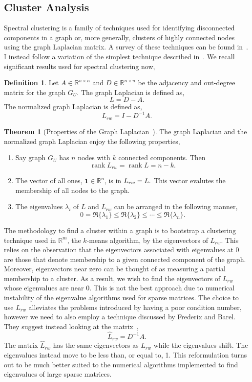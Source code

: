 \documentclass[letterpaper, 10 pt, conference]{ieeeconf}
\theoremstyle{definition}
\newtheorem{definition}{Definition}[section]
\newtheorem{theorem}{Theorem}[section]
\let\ker\relax
\DeclareMathOperator{\rank}{rank}
\DeclareMathOperator{\ker}{ker}
\newcommand{\R}{\mathbb{R}}
\begin{document}
\subsection{Cluster Analysis}
Spectral clustering is a family of techniques used for identifying disconnected components in a graph or, more generally, clusters of highly connected nodes using the graph Laplacian matrix. A survey of these techniques can be found in~\cite{Article:Survey}. I instead follow a variation of the simplest technique described in~\cite{Notes:Laplacian, Article:LaplacianTutorial}. We recall significant results used for spectral clustering now,
\begin{definition}
  Let \(A\in\R^{n \times n}\) and \(D\in\R^{n\times n}\) be the adjacency and out-degree matrix for the graph \(G_U.\) The graph Laplacian is defined as,
  \[
    L = D - A.
  \]
  The normalized graph Laplacian is defined as,
  \[
    L_{rw} = I - D^{-1}A.
  \]
\end{definition}
\begin{theorem}[Properties of the Graph Laplacian~\cite{Notes:Network}]
  The graph Laplacian and the normalized graph Laplacian enjoy the following properties,
  \begin{enumerate}[label=(\alph*)]
    \item{
      Say graph \(G_U\) has \(n\) nodes with \(k\) connected components. Then \[\rank L_{rw} = \rank L = n - k.\]
    }
    \item{
      The vector of all ones, \(\mathbf{1} \in \R^n\), is in \(\ker L_{rw} = \ker L.\) This vector evalutes the membership of all nodes to the graph.
    }
    \item{
      The eigenvalues \(\lambda_i\) of \(L\) and \(L_{rw}\) can be arranged in the following manner,
      \[
        0 = \Re\{\lambda_1\} \leq \Re\{\lambda_2\} \leq \cdots \leq \Re\{\lambda_n\}.
      \]
    }
  \end{enumerate}
\end{theorem}
The methodology to find a cluster within a graph is to bootstrap a clustering technique used in \(\R^m\), the \(k\)-means algorithm, by the eigenvectors of \(L_{rw}.\) This relies on the observation that the eigenvectors associated with eigenvalues at 0 are those that denote membership to a given connected component of the graph. Moreover, eigenvectors near zero can be thought of as measuring a partial membership to a cluster. As a result, we wish to find the eigenvectors of \(L_{rw}\) whose eigenvalues are near 0. This is not the best approach due to numerical instability of the eigenvalue algorithms used for sparse matrices. The choice to use \(L_{rw}\) alleviates the problems introduced by having a poor condition number, however we need to also employ a technique discussed by Frederix and Barel. They suggest instead looking at the matrix~\cite{Article:CholeskyLaplacian},
\[
  \hat{L}_{rw} = D^{-1}A.
\]
The matrix \(\hat{L}_{rw}\) has the same eigenvectors as \(L_{rw}\) while the eigenvalues shift. The eigenvalues instead move to be less than, or equal to, 1. This reformulation turns out to be much better suited to the numerical algorithms implemented to find eigenvalues of large sparse matrices.
\end{document}
